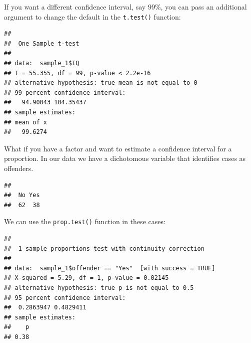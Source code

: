 \documentclass[]{book}
\newenvironment{Shaded}{\begin{snugshade}}{\end{snugshade}}
\newcommand{\CommentTok}[1]{\textcolor[rgb]{0.56,0.35,0.01}{\textit{#1}}}
\newcommand{\DataTypeTok}[1]{\textcolor[rgb]{0.13,0.29,0.53}{#1}}
\newcommand{\DecValTok}[1]{\textcolor[rgb]{0.00,0.00,0.81}{#1}}
\newcommand{\FloatTok}[1]{\textcolor[rgb]{0.00,0.00,0.81}{#1}}
\newcommand{\KeywordTok}[1]{\textcolor[rgb]{0.13,0.29,0.53}{\textbf{#1}}}
\newcommand{\NormalTok}[1]{#1}
\newcommand{\OperatorTok}[1]{\textcolor[rgb]{0.81,0.36,0.00}{\textbf{#1}}}
\newcommand{\StringTok}[1]{\textcolor[rgb]{0.31,0.60,0.02}{#1}}
\theoremstyle{definition}
\theoremstyle{definition}
\theoremstyle{definition}
\theoremstyle{remark}
\begin{document}
If you want a different confidence interval, say 99\%, you can pass an
additional argument to change the default in the \texttt{t.test()}
function:

\begin{Shaded}
\end{Shaded}

\begin{verbatim}
## 
##  One Sample t-test
## 
## data:  sample_1$IQ
## t = 55.355, df = 99, p-value < 2.2e-16
## alternative hypothesis: true mean is not equal to 0
## 99 percent confidence interval:
##   94.90043 104.35437
## sample estimates:
## mean of x 
##   99.6274
\end{verbatim}

What if you have a factor and want to estimate a confidence interval for
a proportion. In our data we have a dichotomous variable that identifies
cases as offenders.

\begin{Shaded}
\end{Shaded}

\begin{verbatim}
## 
##  No Yes 
##  62  38
\end{verbatim}

We can use the \texttt{prop.test()} function in these cases:

\begin{Shaded}
\end{Shaded}

\begin{verbatim}
## 
##  1-sample proportions test with continuity correction
## 
## data:  sample_1$offender == "Yes"  [with success = TRUE]
## X-squared = 5.29, df = 1, p-value = 0.02145
## alternative hypothesis: true p is not equal to 0.5
## 95 percent confidence interval:
##  0.2863947 0.4829411
## sample estimates:
##    p 
## 0.38
\end{verbatim}
\end{document}
